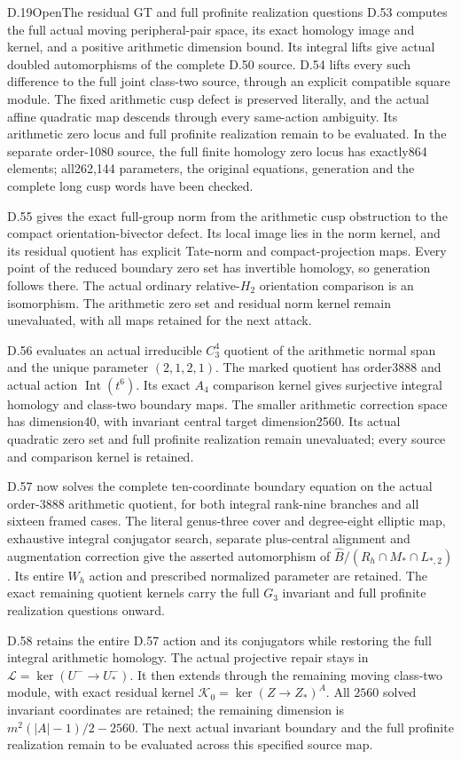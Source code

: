 \begin{statement}{D.19}{Open}{The residual GT and full profinite realization questions}
D.53 computes the full actual moving peripheral-pair space,
its exact homology image and kernel, and a positive arithmetic
dimension bound. Its integral lifts give actual doubled
automorphisms of the complete D.50 source. D.54 lifts every
such difference to the full joint class-two source, through
an explicit compatible square module. The fixed arithmetic
cusp defect is preserved literally, and the actual affine
quadratic map descends through every same-action ambiguity.
Its arithmetic zero locus and full profinite realization
remain to be evaluated. In the separate order-1080 source,
the full finite homology zero locus has exactly864 elements;
all262,144 parameters, the original equations, generation
and the complete long cusp words have been checked.


D.55 gives the exact full-group norm from the arithmetic
cusp obstruction to the compact orientation-bivector defect.
Its local image lies in the norm kernel, and its residual
quotient has explicit Tate-norm and compact-projection maps.
Every point of the reduced boundary zero set has invertible
homology, so generation follows there. The actual ordinary
relative-$H_2$ orientation comparison is an isomorphism.
The arithmetic zero set and residual norm kernel remain
unevaluated, with all maps retained for the next attack.


D.56 evaluates an actual irreducible $C_3^4$ quotient of
the arithmetic normal span and the unique parameter $(2,1,2,1)$.
The marked quotient has order3888 and actual action
$\operatorname{Int}(t^6)$. Its exact $A_4$ comparison kernel
gives surjective integral homology and class-two boundary maps.
The smaller arithmetic correction space has dimension40,
with invariant central target dimension2560. Its actual
quadratic zero set and full profinite realization remain
unevaluated; every source and comparison kernel is retained.


D.57 now solves the complete ten-coordinate boundary equation
on the actual order-$3888$ arithmetic quotient, for both integral
rank-nine branches and all sixteen framed cases. The literal
genus-three cover and degree-eight elliptic map, exhaustive integral
conjugator search, separate plus-central alignment and augmentation
correction give the asserted automorphism of
$\widehat B/(R_h\cap M_*\cap L_{*,2})$.
Its entire $W_h$ action and prescribed normalized parameter are
retained. The exact remaining quotient kernels carry the full
$G_3$ invariant and full profinite realization questions onward.


D.58 retains the entire D.57 action and its conjugators while
restoring the full integral arithmetic homology. The actual
projective repair stays in
$\mathcal L=\ker(U^-\to U_*^-)$.
It then extends through the remaining moving class-two module,
with exact residual kernel
$\mathcal K_0=\ker(Z\to Z_*)^A$.
All $2560$ solved invariant coordinates are retained; the remaining
dimension is $m^2(|A|-1)/2-2560$.
The next actual invariant boundary and the full profinite realization
remain to be evaluated across this specified source map.
\end{statement}
